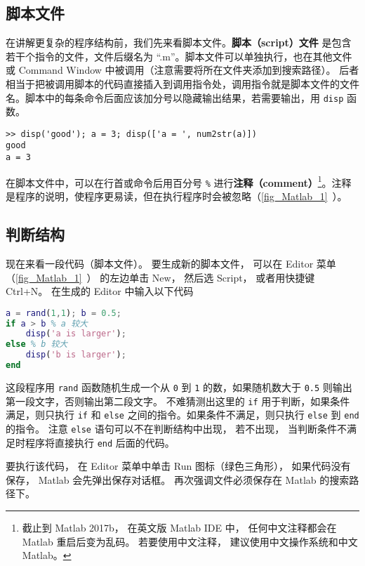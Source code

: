 

\subsection{脚本文件}
在讲解更复杂的程序结构前，我们先来看脚本文件。\textbf{脚本（script）文件} 是包含若干个指令的文件，文件后缀名为 “.m”。脚本文件可以单独执行，也在其他文件或 Command Window 中被调用（注意需要将所在文件夹添加到搜索路径）。 后者相当于把被调用脚本的代码直接插入到调用指令处，调用指令就是脚本文件的文件名。脚本中的每条命令后面应该加分号以隐藏输出结果，若需要输出，用 \verb|disp| 函数。
\begin{lstlisting}[language=matlabC]
>> disp('good'); a = 3; disp(['a = ', num2str(a)])
good
a = 3
\end{lstlisting}
在脚本文件中，可以在行首或命令后用百分号 \verb|%| 进行\textbf{注释（comment）}\footnote{截止到 Matlab 2017b， 在英文版 Matlab IDE 中， 任何中文注释都会在 Matlab 重启后变为乱码。 若要使用中文注释， 建议使用中文操作系统和中文 Matlab。}。注释是程序的说明，使程序更易读，但在执行程序时会被忽略（\autoref{fig_Matlab_1}~）。

\subsection{判断结构}
现在来看一段代码（脚本文件）。 要生成新的脚本文件， 可以在 Editor 菜单（\autoref{fig_Matlab_1}~） 的左边单击 New， 然后选 Script， 或者用快捷键 Ctrl+N。 在生成的 Editor 中输入以下代码

\begin{lstlisting}[language=matlab]
a = rand(1,1); b = 0.5;
if a > b % a 较大
    disp('a is larger');
else % b 较大
    disp('b is larger');
end
\end{lstlisting}

这段程序用 \verb|rand| 函数随机生成一个从 \verb|0| 到 \verb|1| 的数，如果随机数大于 \verb|0.5| 则输出第一段文字，否则输出第二段文字。 不难猜测出这里的 \verb|if| 用于判断，如果条件满足，则只执行 \verb|if| 和 \verb|else| 之间的指令。如果条件不满足，则只执行 \verb|else| 到 \verb|end| 的指令。 注意 \verb|else| 语句可以不在判断结构中出现， 若不出现， 当判断条件不满足时程序将直接执行 \verb|end| 后面的代码。

要执行该代码， 在 Editor 菜单中单击 Run 图标（绿色三角形）， 如果代码没有保存， Matlab 会先弹出保存对话框。 再次强调文件必须保存在 Matlab 的搜索路径下。

